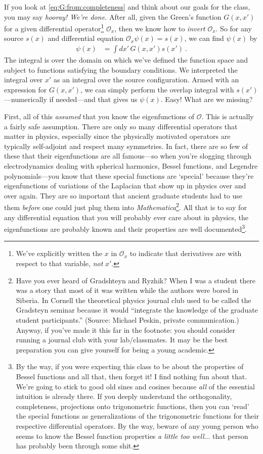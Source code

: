 If you look at \eqref{eq:G:from:completeness} and think about our goals for the class, you may say \emph{hooray! We're done.} After all, given the Green's function $G(x,x')$ for a given differential operator\footnote{We've explicitly written the $x$ in $\mathcal O_x$ to indicate that derivatives are with respect to that variable, \emph{not} $x'$.} $\mathcal O_x$, then we know how to \emph{invert} $\mathcal O_x$. So for any source $s(x)$ and differential equation $\mathcal O_x \psi(x) = s(x)$, we can find $\psi(x)$ by
\begin{align}
  \psi(x) &= \int dx' \, G(x,x') s(x') \ .
\end{align}
The integral is over the domain on which we've defined the function space and subject to functions satisfying the boundary conditions. We interpreted the integral over $x'$ as an integral over the source configuration. Armed with an expression for $G(x,x')$, we can simply perform the overlap integral with $s(x')$---numerically if needed---and that gives us $\psi(x)$. Easy! What are we missing?

First, all of this \emph{assumed} that you know the eigenfunctions of $\mathcal O$. This is actually a fairly safe assumption. There are only so many differential operators that matter in physics, especially since the physically motivated operators are typically self-adjoint and respect many symmetries. In fact, there are so few of these that their eigenfunctions are all famous---so when you're slogging through electrodynamics dealing with spherical harmonics, Bessel functions, and Legendre polynomials---you know that these special functions are `special' because they're eigenfunctions of variations of the Laplacian that show up in physics over and over again. They are so important that ancient graduate students had to use them \emph{before} one could just plug them into \emph{Mathematica}\footnote{Have you ever heard of Gradshteyn and Ryzhik? When I was a student there was a story that most of it was written while the authors were bored in Siberia. In Cornell the theoretical physics journal club used to be called the Gradsteyn seminar because it would ``integrate the knowledge of the graduate student participants.'' (Source: Michael Peskin, private communication.) Anyway, if you've made it this far in the footnote: you should consider running a journal club with your lab/classmates. It may be the best preparation you can give yourself for being a young academic.}. All that is to say for any differential equation that you will probably ever care about in physics, the eigenfunctions are probably known and their properties are well documented\footnote{By the way, if you were expecting this class to be about the properties of Bessel functions and all that, then forget it! I find nothing fun about that. We're going to stick to good old sines and cosines because \emph{all} of the essential intuition is already there. If you deeply understand the orthogonality, completeness, projections onto trigonometric functions, then you can `read' the special functions as generalizations of the trigonometric functions for their respective differential operators. By the way, beware of any young person who seems to know the Bessel function properties \emph{a little too well}... that person has probably been through some shit.}. 

